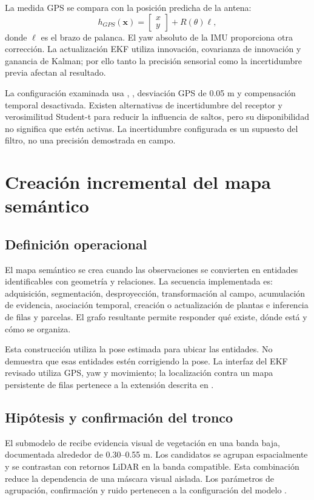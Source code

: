 La medida GPS se compara con la posición predicha de la antena:
\begin{equation}
h_{GPS}(\mathbf x)=\begin{bmatrix}x\\y\end{bmatrix}+R(\theta)\boldsymbol\ell,
\end{equation}
donde $\boldsymbol\ell$ es el brazo de palanca. El yaw absoluto de la IMU proporciona otra corrección. La actualización EKF utiliza innovación, covarianza de innovación y ganancia de Kalman; por ello tanto la precisión sensorial como la incertidumbre previa afectan al resultado.

La configuración examinada usa , , desviación GPS de 0.05 m y compensación temporal desactivada. Existen alternativas de incertidumbre del receptor y verosimilitud Student-t para reducir la influencia de saltos, pero su disponibilidad no significa que estén activas. La incertidumbre configurada es un supuesto del filtro, no una precisión demostrada en campo.

\section{Creación incremental del mapa semántico}
\subsection{Definición operacional}
El mapa semántico se crea cuando las observaciones se convierten en entidades identificables con geometría y relaciones. La secuencia implementada es: adquisición, segmentación, desproyección, transformación al campo, acumulación de evidencia, asociación temporal, creación o actualización de plantas e inferencia de filas y parcelas. El grafo resultante permite responder qué existe, dónde está y cómo se organiza.

Esta construcción utiliza la pose estimada para ubicar las entidades. No demuestra que esas entidades estén corrigiendo la pose. La interfaz del EKF revisado utiliza GPS, yaw y movimiento; la localización contra un mapa persistente de filas pertenece a la extensión descrita en .

\subsection{Hipótesis y confirmación del tronco}
El submodelo  de  recibe evidencia visual de vegetación en una banda baja, documentada alrededor de 0.30--0.55 m. Los candidatos se agrupan espacialmente y se contrastan con retornos LiDAR en la banda compatible. Esta combinación reduce la dependencia de una máscara visual aislada. Los parámetros de agrupación, confirmación y ruido pertenecen a la configuración del modelo \cite{plants}.

